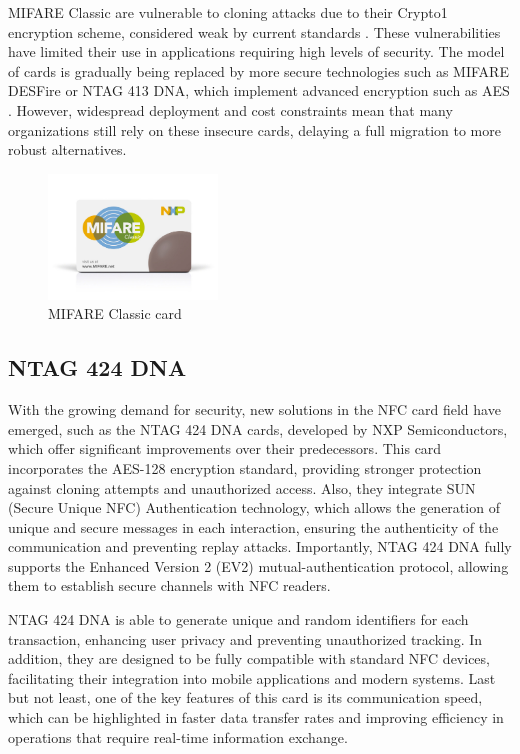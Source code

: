 MIFARE Classic are vulnerable to cloning attacks due to their Crypto1 encryption scheme, considered weak by current standards \cite{ref70}. These vulnerabilities have limited their use in applications requiring high levels of security. The model of cards is gradually being replaced by more secure technologies such as MIFARE DESFire or NTAG 413 DNA, which implement advanced encryption such as AES \cite{ref71}. However, widespread deployment and cost constraints mean that many organizations still rely on these insecure cards, delaying a full migration to more robust alternatives.

\begin{figure}[h!]
	\centering
	\includegraphics[width=0.4\textwidth]{imaxes/mifare1.jpg} %
	\caption{MIFARE Classic card}
	\label{fig:mifare_classic}
\end{figure}

\subsection{NTAG 424 DNA}

With the growing demand for security, new solutions in the NFC card field have emerged, such as the NTAG 424 DNA \cite{ref29} cards, developed by NXP Semiconductors, which offer significant improvements over their predecessors. This card incorporates the AES-128 encryption standard, providing stronger protection against cloning attempts and unauthorized access. Also, they integrate SUN (Secure Unique NFC) Authentication technology, which allows the generation of unique and secure messages in each interaction, ensuring the authenticity of the communication and preventing replay attacks. Importantly, NTAG 424 DNA fully supports the Enhanced Version 2 (EV2) mutual-authentication protocol, allowing them to establish secure channels with NFC readers.

NTAG 424 DNA is able to generate unique and random identifiers for each transaction, enhancing user privacy and preventing unauthorized tracking. In addition, they are designed to be fully compatible with standard NFC devices, facilitating their integration into mobile applications and modern systems. Last but not least, one of the key features of this card is its communication speed, which can be highlighted in faster data transfer rates and improving efficiency in operations that require real-time information exchange.

